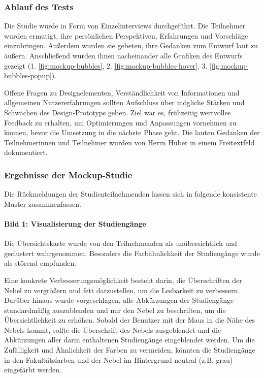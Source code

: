 \subsubsection{Ablauf des Tests}
Die Studie wurde in Form von Einzelinterviews durchgeführt. Die Teilnehmer wurden ermutigt, ihre persönlichen Perspektiven, Erfahrungen und Vorschläge einzubringen. Außerdem wurden sie gebeten, ihre Gedanken zum Entwurf laut zu äußern. Anschließend wurden ihnen nacheinander alle Grafiken des Entwurfs gezeigt (1. \autoref{fig:mockup-bubbles},
2. \autoref{fig:mockup-bubbles-hover}, 3. \autoref{fig:mockup-bubbles-popup}). 

Offene Fragen zu Designelementen, Verständlichkeit von Informationen und allgemeinen Nutzererfahrungen sollten Aufschluss über mögliche Stärken und Schwächen des Design-Proto\-typs geben. Ziel war es, frühzeitig wertvolles Feedback zu erhalten, um Optimierungen und Anpassungen vornehmen zu können, bevor die Umsetzung in die nächste Phase geht. Die lauten Gedanken der Teilnehmerinnen und Teilnehmer wurden von Herrn Huber in einem Freitextfeld dokumentiert.

\subsubsection{Ergebnisse der Mockup-Studie}
Die Rückmeldungen der Studienteilnehmenden lassen sich in folgende konsistente
Muster zusammenfassen.

\paragraph{Bild 1: Visualisierung der Studiengänge}
Die Übersichtskarte wurde von den Teilnehmenden als unübersichtlich und geclustert wahrgenommen. Besonders die Farbähnlichkeit der Studiengänge wurde als störend
empfunden.

Eine konkrete Verbesserungsmöglichkeit besteht darin, die Überschriften der Nebel zu vergrößern und fett darzustellen, um die Lesbarkeit zu verbessern. Darüber hinaus wurde vorgeschlagen, alle Abkürzungen der Studiengänge standardmäßig auszublenden und nur den Nebel zu beschriften, um die Übersichtlichkeit zu erhöhen. Sobald der Benutzer mit der Maus in die Nähe des Nebels kommt, sollte die Überschrift des Nebels ausgeblendet und die Abkürzungen aller darin enthaltenen Studiengänge eingeblendet werden. Um die Zufälligkeit und Ähnlichkeit der Farben zu vermeiden, könnten die Studiengänge in den Fakultätsfarben und der Nebel im Hintergrund neutral (z.B. grau) eingefärbt werden.

